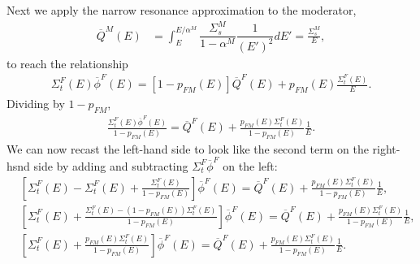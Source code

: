 Next we apply the narrow resonance approximation to the moderator,
\begin{align}
  \overline{Q}^M(E) &= \displaystyle\int_E^{E/\alpha^M} \dfrac{ \Sigma_s^M }{ 1 - \alpha^M } \dfrac{ 1 }{ ( E' )^2 } dE' = \frac{\Sigma_s^M}{E},
\end{align}
to reach the relationship
\begin{align}
  \Sigma_t^F(E) \overline{\phi}^F(E) = [ 1 - p_{FM}(E) ] \overline{Q}^F(E) + p_{FM}(E) \frac{\Sigma_t^F(E)}{E} . \label{Eq:libraryGeneration_fluxSpectrumFuel_afterNRonModerator}
\end{align}
Dividing by $1 - p_{FM}$,
\begin{align}
  \frac{ \Sigma_t^F(E) \overline{\phi}^F(E) }{ 1 - p_{FM}(E) } =  \overline{Q}^F(E) + \frac{ p_{FM}(E) \Sigma_t^F(E) }{ 1 - p_{FM}(E) } \frac{1}{E} . 
\end{align}
We can now recast the left-hand side to look like the second term on the right-hsnd side by adding and subtracting $\Sigma_t^F \overline{\phi}^F$ on the left:
\begin{align}
  &\left[ \Sigma_t^F(E) - \Sigma_t^F(E) + \frac{ \Sigma_t^F(E) }{ 1 - p_{FM}(E) } \right] \overline{\phi}^F(E) =  \overline{Q}^F(E) + \frac{ p_{FM}(E) \Sigma_t^F(E) }{ 1 - p_{FM}(E) } \frac{1}{E} , \nonumber \\
  &\left[ \Sigma_t^F(E) + \frac{ \Sigma_t^F(E) - ( 1 - p_{FM}(E) ) \Sigma_t^F(E) }{ 1 - p_{FM}(E) } \right] \overline{\phi}^F(E) =  \overline{Q}^F(E) + \frac{ p_{FM}(E) \Sigma_t^F(E) }{ 1 - p_{FM}(E) } \frac{1}{E} , \nonumber \\
  &\left[ \Sigma_t^F(E) + \frac{  p_{FM}(E) \Sigma_t^F(E) }{ 1 - p_{FM}(E) } \right] \overline{\phi}^F(E) =  \overline{Q}^F(E) + \frac{ p_{FM}(E) \Sigma_t^F(E) }{ 1 - p_{FM}(E) } \frac{1}{E} .
\end{align}


